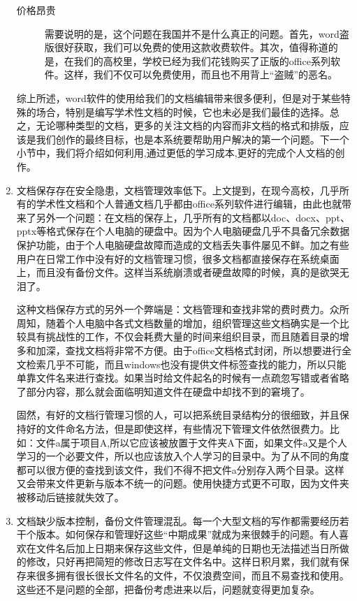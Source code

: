 \begin{enumerate}
\begin{description}
  \item[价格昂贵] 需要说明的是，这个问题在我国并不是什么真正的问题。首先，word盗版很好获取，我们可以免费的使用这款收费软件。其次，值得称道的是，在我们的高校里，学校已经为我们花钱购买了正版的office系列软件。这样，我们不仅可以免费使用，而且也不用背上“盗贼”的恶名。
  \end{description}
综上所述，word软件的使用给我们的文档编辑带来很多便利，但是对于某些特殊的场合，特别是编写学术性文档的时候，它也未必是我们最佳的选择。总之，无论哪种类型的文档，更多的关注文档的内容而非文档的格式和排版，应该是我们创作的最终目标，也是本系统要帮助用户解决的第一个问题。下一个小节中，我们将介绍如何利用,通过更低的学习成本,更好的完成个人文档的创作。
\item 文档保存存在安全隐患，文档管理效率低下。上文提到，在现今高校，几乎所有的学术性文档和个人普通文档几乎都由office系列软件进行编辑，由此也就带来了另外一个问题：在文档的保存上，几乎所有的文档都以doc、docx、ppt、pptx等格式保存在个人电脑的硬盘中。因为个人电脑硬盘几乎不具备冗余数据保护功能，由于个人电脑硬盘故障而造成的文档丢失事件屡见不鲜。加之有些用户在日常工作中没有好的文档管理习惯，很多文档都直接保存在系统桌面上，而且没有备份文件。这样当系统崩溃或者硬盘故障的时候，真的是欲哭无泪了。

这种文档保存方式的另外一个弊端是：文档管理和查找非常的费时费力。众所周知，随着个人电脑中各式文档数量的增加，组织管理这些文档确实是一个比较具有挑战性的工作，不仅会耗费大量的时间来组织目录，而且随着目录的增多和加深，查找文档将非常不方便。由于office文档格式封闭，所以想要进行全文检索几乎不可能，而且windows也没有提供文件标签查找的能力，所以只能单靠文件名来进行查找。如果当时给文件起名的时候有一点疏忽写错或者省略了部分内容，那么就会面临明知道文件在硬盘中却找不到的窘境了。

固然，有好的文档行管理习惯的人，可以把系统目录结构分的很细致，并且保持好的文件命名方法，但是即使这样，有些情况下管理文件依然很费力。比如：文件a属于项目A,所以它应该被放置于文件夹A下面，如果文件a又是个人学习的一个必要文件，所以也应该放入个人学习的目录中。为了从不同的角度都可以很方便的查找到该文件，我们不得不把文件a分别存入两个目录。这样又会带来文件更新与版本不统一的问题。使用快捷方式更不可取，因为文件夹被移动后链接就失效了。
\item 文档缺少版本控制，备份文件管理混乱。每一个大型文档的写作都需要经历若干个版本。如何保存和管理好这些“中期成果”就成为来很棘手的问题。有人喜欢在文件名后加上日期来保存这些文件，但是单纯的日期也无法描述当日所做的修改，只好再把简短的修改日志写在文件名中。这样日积月累，我们就有保存来很多拥有很长很长文件名的文件，不仅浪费空间，而且不易查找和使用。这些还不是问题的全部，把备份考虑进来以后，问题就变得更加复杂。


\end{enumerate}
